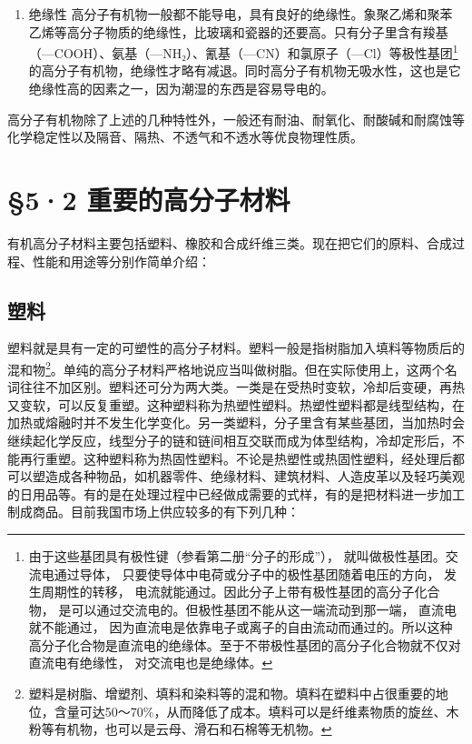 \begin{enumerate}[start=4]
\item
  绝缘性
  高分子有机物一般都不能导电，具有良好的绝缘性。象聚乙烯和聚苯乙烯等高分子物质的绝缘性，比玻璃和瓷器的还要高。只有分子里含有羧基（---COOH）、氨基（---NH₂）、氰基（---CN）和氯原子（---Cl）等极性基团\footnote{由于这些基团具有极性键（参看第二册``分子的形成''），
    就叫做极性基团。交流电通过导体，
    只要使导体中电荷或分子中的极性基团随着电压的方向，
    发生周期性的转移，
    电流就能通过。因此分子上带有极性基团的高分子化合物，
    是可以通过交流电的。但极性基团不能从这一端流动到那一端，
    直流电就不能通过，
    因为直流电是依靠电子或离子的自由流动而通过的。所以这种高分子化合物是直流电的绝缘体。至于不带极性基团的高分子化合物就不仅对直流电有绝缘性，
    对交流电也是绝缘体。}的高分子有机物，绝缘性才略有减退。同时高分子有机物无吸水性，这也是它绝缘性高的因素之一，因为潮湿的东西是容易导电的。
\end{enumerate}

高分子有机物除了上述的几种特性外，一般还有耐油、耐氧化、耐酸碱和耐腐蚀等化学稳定性以及隔音、隔热、不透气和不透水等优良物理性质。

\section{§5·2 重要的高分子材料}

有机高分子材料主要包括塑料、橡胶和合成纤维三类。现在把它们的原料、合成过程、性能和用途等分别作简单介绍：

\subsection{塑料}

塑料就是具有一定的可塑性的高分子材料。塑料一般是指树脂加入填料等物质后的混和物\footnote{塑料是树脂、增塑剂、填料和染料等的混和物。填料在塑料中占很重要的地位，含量可达50～70\%，从而降低了成本。填料可以是纤维素物质的旋丝、木粉等有机物，也可以是云母、滑石和石棉等无机物。}。单纯的高分子材料严格地说应当叫做树脂。但在实际使用上，这两个名词往往不加区别。塑料还可分为两大类。一类是在受热时变软，冷却后变硬，再热又变软，可以反复重塑。这种塑料称为热塑性塑料。热塑性塑料都是线型结构，在加热或熔融时并不发生化学变化。另一类塑料，分子里含有某些基团，当加热时会继续起化学反应，线型分子的链和链间相互交联而成为体型结构，冷却定形后，不能再行重塑。这种塑料称为热固性塑料。不论是热塑性或热固性塑料，经处理后都可以塑造成各种物品，如机器零件、绝缘材料、建筑材料、人造皮革以及轻巧美观的日用品等。有的是在处理过程中已经做成需要的式样，有的是把材料进一步加工制成商品。目前我国市场上供应较多的有下列几种：


